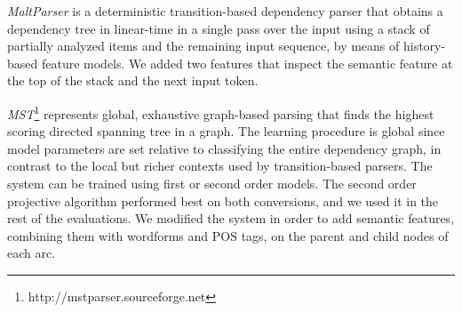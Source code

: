 \documentclass[11pt]{article}
\begin{document}
\emph{MaltParser} \cite{niv2007a} is a deterministic transition-based dependency parser 
that obtains a dependency tree in linear-time in a single pass over the input using a stack of partially analyzed items and the remaining input sequence,
by means of history-based feature models. 
We added two features that inspect the semantic feature at the top of the stack and the next input token.


\emph{MST}\footnote{http://mstparser.sourceforge.net} represents global, exhaustive graph-based parsing \cite{mcdonald2005,mcdonald2006} that finds the highest scoring directed spanning tree in a graph. 
The learning procedure is global since model parameters are set relative to classifying the entire dependency graph, 
 in contrast to the local but richer contexts used by transition-based parsers.
The system can be trained using first or second order models. 
The second order projective algorithm performed best on both conversions, and we used it in the rest of the evaluations. 
We modified the system in order to add  semantic features, combining them with wordforms and POS tags, on the parent and child nodes of each arc. %
\end{document}

